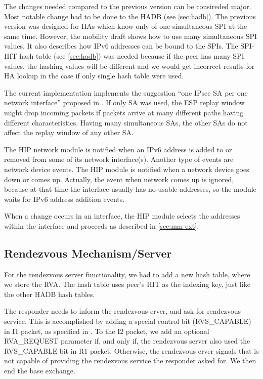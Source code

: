 The changes needed compared to the previous version can be consireded
major. Most notable change had to be done to the \ac{HADB} (see
\ref{sec:hadb}). The previous version was designed for
\acp{HA} which know only of one simultaneous \ac{SPI} at the same
time. However, the mobility draft \cite{hip-ietf-mm-00} shows how to
use many simultaneous \ac{SPI} values. It also describes how IPv6
addresses can be bound to the \acp{SPI}. The SPI-HIT hash table (see
\ref{sec:hadb}) was needed because if the peer has many \ac{SPI}
values, the hashing values will be different and we would get
incorrect results for \ac{HA} lookup in the case if only single hash
table were used.

The current implementation implements the suggestion ``one \ac{IPsec}
\ac{SA} per one network interface'' proposed in
\cite{hip-ietf-mm-00}. If only \ac{SA} was used, the \ac{ESP} replay
window might drop incoming packets if packets arrive at many different
paths having different characteristics. Having many simultaneous
\acp{SA}, the other \acp{SA} do not affect the replay window of any
other \ac{SA}.

The \ac{HIP} network module is notified when an IPv6 address is added
to or removed from some of its network interface(s). Another type of
events are network device events. The \ac{HIP} module is notified when
a network device goes down or comes up. Actually, the event when
network comes up is ignored, because at that time the interface
usually has no usable addresses, so the module waits for IPv6 address
addition events.

When a change occurs in an interface, the HIP module selects the
addresses within the interface and proceeds as described in
\autoref{sec:mm-ext}.

\subsection{Rendezvous Mechanism/Server}
\label{sec:rendezvous_server}

For the rendezvous server functionality, we had to add a new hash
table, where we store the \ac{RVA}. The hash table uses peer's HIT as
the indexing key, just like the other \ac{HADB} hash tables.

The responder needs to inform the rendezvous erver, and ask for
rendezvous service. This is accomplished by adding a special control
bit (RVS\_CAPABLE) in I1 packet, as specified in \cite{rvs-00}.  To
the I2 packet, we add an optional RVA\_REQUEST parameter if, and only
if, the rendezvous server also used the RVS\_CAPABLE bit in R1 packet.
Otherwise, the rendezvous erver signals that is not capable of
providing the rendezvous service the responder asked for. We then end
the base exchange.

